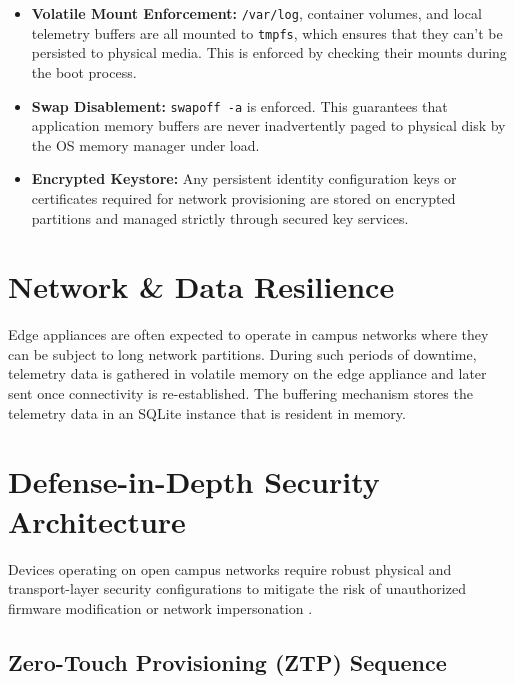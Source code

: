 \documentclass[conference]{IEEEtran}
\begin{document}
\begin{itemize}
    \item \textbf{Volatile Mount Enforcement:} \texttt{/var/log}, container volumes, and local telemetry buffers are all mounted to \texttt{tmpfs}, which ensures that they can't be persisted to physical media. This is enforced by checking their mounts during the boot process.
    \item \textbf{Swap Disablement:} \texttt{swapoff -a} is enforced. This guarantees that application memory buffers are never inadvertently paged to physical disk by the OS memory manager under load.
    \item \textbf{Encrypted Keystore:} Any persistent identity configuration keys or certificates required for network provisioning are stored on encrypted partitions and managed strictly through secured key services.
\end{itemize}

\section{Network \& Data Resilience}

Edge appliances are often expected to operate in campus networks where they can be subject to long network partitions. During such periods of downtime, telemetry data is gathered in volatile memory on the edge appliance and later sent once connectivity is re-established. The buffering mechanism stores the telemetry data in an SQLite instance that is resident in memory.

\section{Defense-in-Depth Security Architecture}

Devices operating on open campus networks require robust physical and transport-layer security configurations to mitigate the risk of unauthorized firmware modification or network impersonation \cite{b16}.

\subsection{Zero-Touch Provisioning (ZTP) Sequence}
\end{document}

